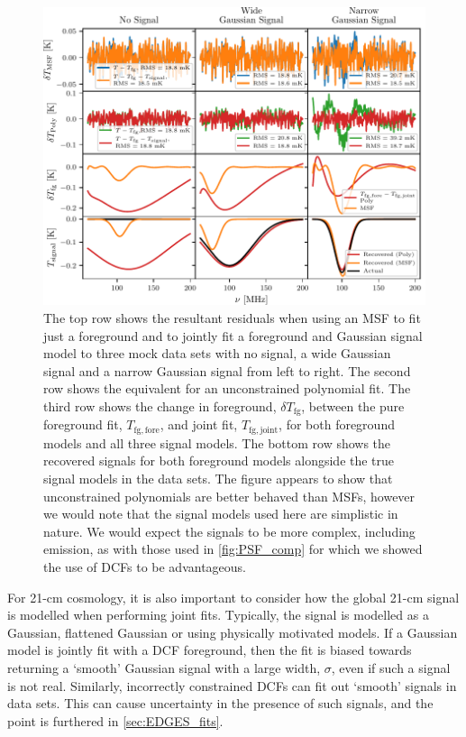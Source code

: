 \begin{figure}
    \centering
    \includegraphics{maxsmooth/figs/Figure9.pdf}
    \caption{The top row shows the resultant residuals when using an MSF to fit just a foreground and to jointly fit a foreground and Gaussian signal model to three mock data sets with no signal, a wide Gaussian signal and a narrow Gaussian signal from left to right. The second row shows the equivalent for an unconstrained polynomial fit. The third row shows the change in foreground, $\delta T_\mathrm{fg}$, between the pure foreground fit, $T_\mathrm{fg, fore}$, and joint fit, $T_\mathrm{fg, joint}$, for both foreground models and all three signal models. The bottom row shows the recovered signals for both foreground models alongside the true signal models in the data sets. The figure appears to show that unconstrained polynomials are better behaved than MSFs, however we would note that the signal models used here are simplistic in nature. We would expect the signals to be more complex, including emission, as with those used in \cref{fig:PSF_comp} for which we showed the use of DCFs to be advantageous.}
    \label{fig:smooth_gauss}
\end{figure}

For 21-cm cosmology, it is also important to consider how the global 21-cm signal is modelled when performing joint fits. Typically, the signal is modelled as a Gaussian, flattened Gaussian or using physically motivated models. If a Gaussian model is jointly fit with a DCF foreground, then the fit is biased towards returning a `smooth' Gaussian signal with a large width, $\sigma$, even if such a signal is not real. Similarly, incorrectly constrained DCFs can fit out `smooth' signals in data sets. This can cause uncertainty in the presence of such signals, and the point is furthered in \cref{sec:EDGES_fits}.

